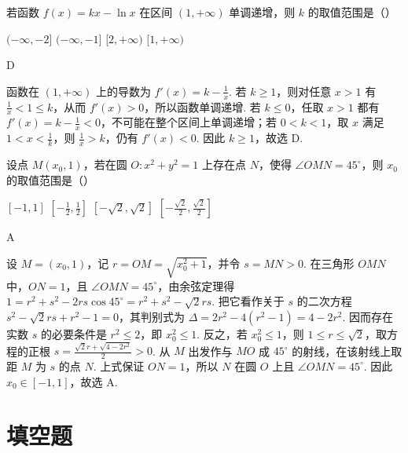 \begin{problem}
若函数 \(f(x)=kx-\ln x\) 在区间 \((1,+\infty)\) 单调递增，则 \(k\) 的取值范围是（\quad）

\choices
    {\((-\infty,-2]\)}
    {\((-\infty,-1]\)}
    {\([2,+\infty)\)}
    {\([1,+\infty)\)}
\end{problem}

\begin{answer}
D
\end{answer}

\begin{solution}
函数在 \((1,+\infty)\) 上的导数为 \(f'(x)=k-\frac1x\). 若 \(k\geqslant1\)，则对任意 \(x>1\) 有 \(\frac1x<1\leqslant k\)，从而 \(f'(x)>0\)，所以函数单调递增.
若 \(k\leqslant0\)，任取 \(x>1\) 都有 \(f'(x)=k-\frac1x<0\)，不可能在整个区间上单调递增；若 \(0<k<1\)，取 \(x\) 满足 \(1<x<\frac1k\)，则 \(\frac1x>k\)，仍有 \(f'(x)<0\). 因此 \(k\geqslant1\)，故选 D.
\end{solution}

\begin{problem}
设点 \(M(x_0,1)\)，若在圆 \(O:x^2+y^2=1\) 上存在点 \(N\)，使得 \(\angle OMN=45^{\circ}\)，则 \(x_0\) 的取值范围是（\quad）

\choices
    {\([-1,1]\)}
    {\(\left[-\frac{1}{2},\frac{1}{2}\right]\)}
    {\(\left[-\sqrt{2},\sqrt{2}\right]\)}
    {\(\left[-\frac{\sqrt{2}}{2},\frac{\sqrt{2}}{2}\right]\)}
\end{problem}

\begin{answer}
A
\end{answer}

\begin{solution}
设 \(M=(x_0,1)\)，记 \(r=OM=\sqrt{x_0^2+1}\)，并令 \(s=MN>0\). 在三角形 \(OMN\) 中，\(ON=1\)，且 \(\angle OMN=45^{\circ}\)，由余弦定理得
\(1=r^2+s^2-2rs\cos45^{\circ}=r^2+s^2-\sqrt2rs\).
把它看作关于 \(s\) 的二次方程 \(s^2-\sqrt2rs+r^2-1=0\)，其判别式为
\(\Delta=2r^2-4(r^2-1)=4-2r^2\). 因而存在实数 \(s\) 的必要条件是 \(r^2\leqslant2\)，即 \(x_0^2\leqslant1\).
反之，若 \(x_0^2\leqslant1\)，则 \(1\leqslant r\leqslant\sqrt2\)，取方程的正根
\(\displaystyle s=\frac{\sqrt2r+\sqrt{4-2r^2}}{2}>0\).
从 \(M\) 出发作与 \(MO\) 成 \(45^{\circ}\) 的射线，在该射线上取距 \(M\) 为 \(s\) 的点 \(N\). 上式保证 \(ON=1\)，所以 \(N\) 在圆 \(O\) 上且 \(\angle OMN=45^{\circ}\). 因此 \(x_0\in[-1,1]\)，故选 A.
\end{solution}

\section{填空题}

